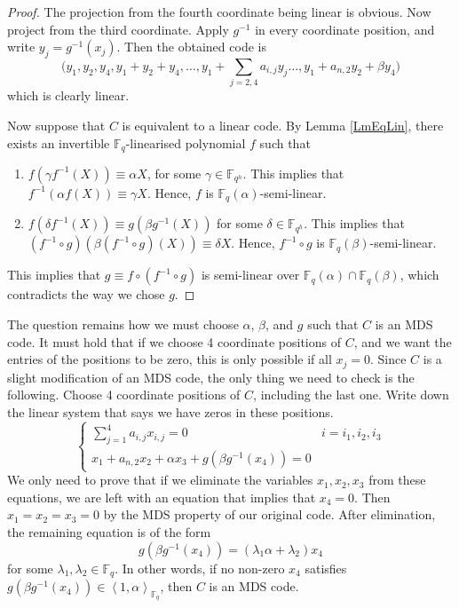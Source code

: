 \documentclass[a4paper]{article}
\theoremstyle{definition}
\newcommand{\FF}{\mathbb F}
\newcommand{\vspan}[1]{\left \langle #1 \right \rangle}
\begin{document}
\begin{proof}
The projection from the fourth coordinate being linear is obvious.
Now project from the third coordinate.
Apply $g^{-1}$ in every coordinate position, and write $y_j = g^{-1}(x_j)$.
Then the obtained code is
\[
 \Big( y_1,y_2,y_4,y_1+y_2+y_4, \dots, y_1 + \sum_{j=2,4} a_{i,j} y_j \dots, y_1 + a_{n,2} y_2 + \beta y_4 \Big)
\]
which is clearly linear.

Now suppose that $C$ is equivalent to a linear code.
By Lemma \ref{LmEqLin}, there exists an invertible $\FF_q$-linearised polynomial $f$ such that
\begin{enumerate}
 \item \( f(\gamma f^{-1}(X)) \equiv \alpha X \), for some \( \gamma \in \FF_{q^h} \).
 This implies that \( f^{-1} ( \alpha f(X)) \equiv \gamma X \).
 Hence, $f$ is $\FF_q(\alpha)$-semi-linear.
 \item \( f(\delta f^{-1}(X)) \equiv g( \beta g^{-1}(X)) \) for some \( \delta \in \FF_{q^h} \).
 This implies that \( (f^{-1} \circ g) ( \beta (f^{-1} \circ g)(X)) \equiv \delta X \).
 Hence, $f^{-1} \circ g$ is $\FF_q(\beta)$-semi-linear.
\end{enumerate}
This implies that $g \equiv f \circ (f^{-1} \circ g)$ is semi-linear over \( \FF_q(\alpha) \cap \FF_q(\beta) \), which contradicts the way we chose $g$.
\end{proof}

The question remains how we must choose $\alpha$, $\beta$, and $g$ such that $C$ is an MDS code.
It must hold that if we choose 4 coordinate positions of $C$, and we want the entries of the positions to be zero, this is only possible if all $x_j=0$.
Since $C$ is a slight modification of an MDS code, the only thing we need to check is the following.
Choose 4 coordinate positions of $C$, including the last one.
Write down the linear system that says we have zeros in these positions.
\[
 \begin{cases}
 \sum_{j=1}^4 a_{i,j} x_{i,j} = 0 & i=i_1,i_2,i_3 \\
 x_1 + a_{n,2} x_2 + \alpha x_3 + g( \beta g^{-1} (x_4)) = 0
 \end{cases}
\]
We only need to prove that if we eliminate the variables $x_1, x_2, x_3$ from these equations, we are left with an equation that implies that $x_4=0$.
Then $x_1=x_2=x_3=0$ by the MDS property of our original code.
After elimination, the remaining equation is of the form
\[
 g( \beta g^{-1} (x_4)) = (\lambda_1 \alpha + \lambda_2) x_4
\]
for some \( \lambda_1, \lambda_2 \in \FF_q \).
In other words, if no non-zero $x_4$ satisfies $g(\beta g^{-1}(x_4)) \in \vspan{1,\alpha}_{\FF_q}$, then $C$ is an MDS code.
\end{document}
